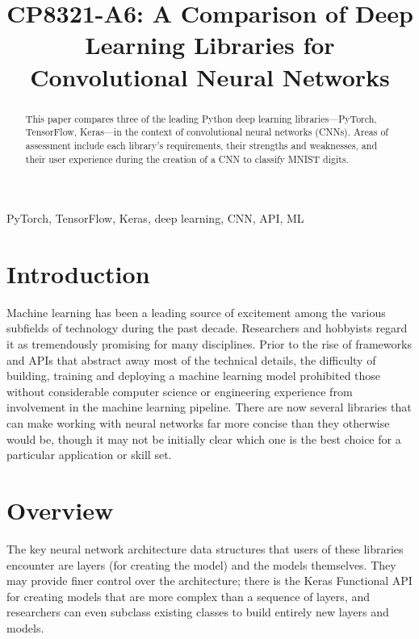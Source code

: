 \documentclass[conference]{IEEEtran}
\begin{document}
\title{CP8321-A6: A Comparison of Deep Learning Libraries for Convolutional Neural Networks\\
}

\author{
}

\maketitle


\begin{abstract}
This paper compares three of the leading Python deep learning libraries---PyTorch, TensorFlow, Keras---in the context of convolutional neural networks (CNNs). Areas of assessment include each library's requirements, their strengths and weaknesses, and their user experience during the creation of a CNN to classify MNIST digits. 
\end{abstract}

\begin{IEEEkeywords}
PyTorch, TensorFlow, Keras, deep learning, CNN, API, ML
\end{IEEEkeywords}

\section{Introduction}
Machine learning has been a leading source of excitement among the various subfields of technology during the past decade. Researchers and hobbyists regard it as tremendously promising for many disciplines. Prior to the rise of frameworks and APIs that abstract away most of the technical details, the difficulty of building, training and deploying a machine learning model prohibited those without considerable computer science or engineering experience from involvement in the machine learning pipeline. There are now several libraries that can make working with neural networks far more concise than they otherwise would be, though it may not be initially clear which one is the best choice for a particular application or skill set. 
\section{Overview}
The key neural network architecture data structures that users of these libraries encounter are layers (for creating the model) and the models themselves. They may provide finer control over the architecture; there is the Keras Functional API for creating models that are more complex than a sequence of layers, and researchers can even subclass existing classes to build entirely new layers and models.
\end{document}
